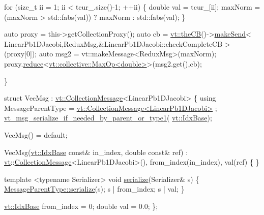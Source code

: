 \begin{DoxyCodeInclude}
    \textcolor{keywordflow}{for} (\textcolor{keywordtype}{size\_t} ii = 1; ii < tcur\_.size()-1; ++ii) \{
      \textcolor{keywordtype}{double} val = tcur\_[ii];
      maxNorm = (maxNorm > std::fabs(val)) ? maxNorm : std::fabs(val);
    \}

    \textcolor{keyword}{auto} proxy = this->getCollectionProxy();
    \textcolor{keyword}{auto} cb = \hyperlink{namespacevt_a673b109e94c7bca58313504c83e1da94}{vt::theCB}()->\hyperlink{structvt_1_1pipe_1_1_pipe_manager_a73583be6260418b13ee66e56cdade2da}{makeSend}<
      LinearPb1DJacobi,ReduxMsg,&LinearPb1DJacobi::checkCompleteCB
    >(proxy[0]);
    \textcolor{keyword}{auto} msg2 = vt::makeMessage<ReduxMsg>(maxNorm);
    proxy.\hyperlink{structvt_1_1objgroup_1_1proxy_1_1_proxy_a61273d407174fb496b4aed10ec6650bd}{reduce}<\hyperlink{structvt_1_1collective_1_1reduce_1_1operators_1_1_max_op}{vt::collective::MaxOp<double>}>(msg2.get(),cb);

  \}


  \textcolor{keyword}{struct }VecMsg : \hyperlink{structvt_1_1vrt_1_1collection_1_1_collection_message}{vt::CollectionMessage}<LinearPb1DJacobi> \{
    \textcolor{keyword}{using} MessageParentType = \hyperlink{structvt_1_1vrt_1_1collection_1_1_collection_message}{vt::CollectionMessage<LinearPb1DJacobi>}
      ;
    \hyperlink{message__serialize_8h_a3452798707ea3a45f9da58f7b4673990}{vt\_msg\_serialize\_if\_needed\_by\_parent\_or\_type1}(
      \hyperlink{namespacevt_afb96657e28fa98eb685c5e0c6b1b122e}{vt::IdxBase});

    VecMsg() = \textcolor{keywordflow}{default};

    VecMsg(\hyperlink{namespacevt_afb96657e28fa98eb685c5e0c6b1b122e}{vt::IdxBase} \textcolor{keyword}{const}& in\_index, \textcolor{keywordtype}{double} \textcolor{keyword}{const}& ref) :
      \hyperlink{namespacevt}{vt}::\hyperlink{namespacevt_ae7700e12f79c0fec16964aab84838428}{CollectionMessage}<LinearPb1DJacobi>(),
      from\_index(in\_index), val(ref)
    \{ \}

    \textcolor{keyword}{template} <\textcolor{keyword}{typename} Serializer>
    \textcolor{keywordtype}{void} \hyperlink{namespacecheckpoint_a075da4e7344cf037943362517e606c3a}{serialize}(Serializer& s) \{
      \hyperlink{namespacecheckpoint_a075da4e7344cf037943362517e606c3a}{MessageParentType::serialize}(s);
      s | from\_index;
      s | val;
    \}

    \hyperlink{namespacevt_afb96657e28fa98eb685c5e0c6b1b122e}{vt::IdxBase} from\_index = 0;
    \textcolor{keywordtype}{double} val = 0.0;
  \};


\end{DoxyCodeInclude}
